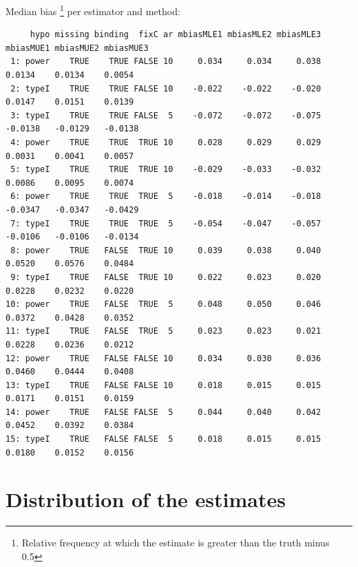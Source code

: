 \documentclass[12pt]{article}
\begin{document}
Median bias \footnote{Relative frequency at which the estimate is greater than the truth minus 0.5} per estimator and method:
\begin{adjustwidth}{-1cm}{-1cm}
\begin{verbatim}
     hypo missing binding  fixC ar mbiasMLE1 mbiasMLE2 mbiasMLE3 mbiasMUE1 mbiasMUE2 mbiasMUE3
 1: power    TRUE    TRUE FALSE 10     0.034     0.034     0.038    0.0134    0.0134    0.0054
 2: typeI    TRUE    TRUE FALSE 10    -0.022    -0.022    -0.020    0.0147    0.0151    0.0139
 3: typeI    TRUE    TRUE FALSE  5    -0.072    -0.072    -0.075   -0.0138   -0.0129   -0.0138
 4: power    TRUE    TRUE  TRUE 10     0.028     0.029     0.029    0.0031    0.0041    0.0057
 5: typeI    TRUE    TRUE  TRUE 10    -0.029    -0.033    -0.032    0.0086    0.0095    0.0074
 6: power    TRUE    TRUE  TRUE  5    -0.018    -0.014    -0.018   -0.0347   -0.0347   -0.0429
 7: typeI    TRUE    TRUE  TRUE  5    -0.054    -0.047    -0.057   -0.0106   -0.0106   -0.0134
 8: power    TRUE   FALSE  TRUE 10     0.039     0.038     0.040    0.0520    0.0576    0.0484
 9: typeI    TRUE   FALSE  TRUE 10     0.022     0.023     0.020    0.0228    0.0232    0.0220
10: power    TRUE   FALSE  TRUE  5     0.048     0.050     0.046    0.0372    0.0428    0.0352
11: typeI    TRUE   FALSE  TRUE  5     0.023     0.023     0.021    0.0228    0.0236    0.0212
12: power    TRUE   FALSE FALSE 10     0.034     0.030     0.036    0.0460    0.0444    0.0408
13: typeI    TRUE   FALSE FALSE 10     0.018     0.015     0.015    0.0171    0.0151    0.0159
14: power    TRUE   FALSE FALSE  5     0.044     0.040     0.042    0.0452    0.0392    0.0384
15: typeI    TRUE   FALSE FALSE  5     0.018     0.015     0.015    0.0180    0.0152    0.0156
\end{verbatim}

\end{adjustwidth}

\clearpage

\section{Distribution of the estimates}
\label{sec:org1423ed4}
\end{document}
